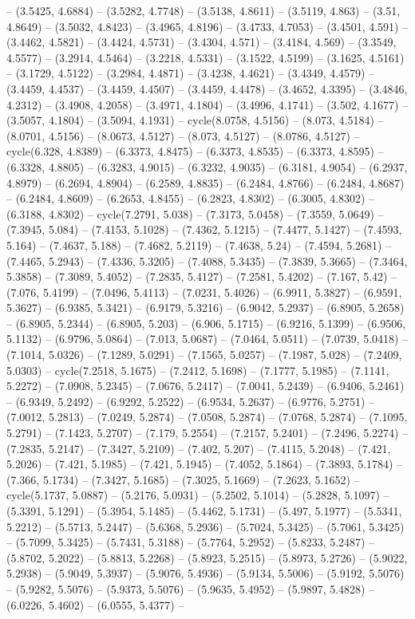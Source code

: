 -- (3.5425, 4.6884) -- (3.5282, 4.7748) -- (3.5138, 4.8611) -- (3.5119, 4.863) -- (3.51, 4.8649) -- (3.5032, 4.8423) -- (3.4965, 4.8196) -- (3.4733, 4.7053) -- (3.4501, 4.591) -- (3.4462, 4.5821) -- (3.4424, 4.5731) -- (3.4304, 4.571) -- (3.4184, 4.569) -- (3.3549, 4.5577) -- (3.2914, 4.5464) -- (3.2218, 4.5331) -- (3.1522, 4.5199) -- (3.1625, 4.5161) -- (3.1729, 4.5122) -- (3.2984, 4.4871) -- (3.4238, 4.4621) -- (3.4349, 4.4579) -- (3.4459, 4.4537) -- (3.4459, 4.4507) -- (3.4459, 4.4478) -- (3.4652, 4.3395) -- (3.4846, 4.2312) -- (3.4908, 4.2058) -- (3.4971, 4.1804) -- (3.4996, 4.1741) -- (3.502, 4.1677) -- (3.5057, 4.1804) -- (3.5094, 4.1931) -- cycle(8.0758, 4.5156) -- (8.073, 4.5184) -- (8.0701, 4.5156) -- (8.0673, 4.5127) -- (8.073, 4.5127) -- (8.0786, 4.5127) -- cycle(6.328, 4.8389) -- (6.3373, 4.8475) -- (6.3373, 4.8535) -- (6.3373, 4.8595) -- (6.3328, 4.8805) -- (6.3283, 4.9015) -- (6.3232, 4.9035) -- (6.3181, 4.9054) -- (6.2937, 4.8979) -- (6.2694, 4.8904) -- (6.2589, 4.8835) -- (6.2484, 4.8766) -- (6.2484, 4.8687) -- (6.2484, 4.8609) -- (6.2653, 4.8455) -- (6.2823, 4.8302) -- (6.3005, 4.8302) -- (6.3188, 4.8302) -- cycle(7.2791, 5.038) -- (7.3173, 5.0458) -- (7.3559, 5.0649) -- (7.3945, 5.084) -- (7.4153, 5.1028) -- (7.4362, 5.1215) -- (7.4477, 5.1427) -- (7.4593, 5.164) -- (7.4637, 5.188) -- (7.4682, 5.2119) -- (7.4638, 5.24) -- (7.4594, 5.2681) -- (7.4465, 5.2943) -- (7.4336, 5.3205) -- (7.4088, 5.3435) -- (7.3839, 5.3665) -- (7.3464, 5.3858) -- (7.3089, 5.4052) -- (7.2835, 5.4127) -- (7.2581, 5.4202) -- (7.167, 5.42) -- (7.076, 5.4199) -- (7.0496, 5.4113) -- (7.0231, 5.4026) -- (6.9911, 5.3827) -- (6.9591, 5.3627) -- (6.9385, 5.3421) -- (6.9179, 5.3216) -- (6.9042, 5.2937) -- (6.8905, 5.2658) -- (6.8905, 5.2344) -- (6.8905, 5.203) -- (6.906, 5.1715) -- (6.9216, 5.1399) -- (6.9506, 5.1132) -- (6.9796, 5.0864) -- (7.013, 5.0687) -- (7.0464, 5.0511) -- (7.0739, 5.0418) -- (7.1014, 5.0326) -- (7.1289, 5.0291) -- (7.1565, 5.0257) -- (7.1987, 5.028) -- (7.2409, 5.0303) -- cycle(7.2518, 5.1675) -- (7.2412, 5.1698) -- (7.1777, 5.1985) -- (7.1141, 5.2272) -- (7.0908, 5.2345) -- (7.0676, 5.2417) -- (7.0041, 5.2439) -- (6.9406, 5.2461) -- (6.9349, 5.2492) -- (6.9292, 5.2522) -- (6.9534, 5.2637) -- (6.9776, 5.2751) -- (7.0012, 5.2813) -- (7.0249, 5.2874) -- (7.0508, 5.2874) -- (7.0768, 5.2874) -- (7.1095, 5.2791) -- (7.1423, 5.2707) -- (7.179, 5.2554) -- (7.2157, 5.2401) -- (7.2496, 5.2274) -- (7.2835, 5.2147) -- (7.3427, 5.2109) -- (7.402, 5.207) -- (7.4115, 5.2048) -- (7.421, 5.2026) -- (7.421, 5.1985) -- (7.421, 5.1945) -- (7.4052, 5.1864) -- (7.3893, 5.1784) -- (7.366, 5.1734) -- (7.3427, 5.1685) -- (7.3025, 5.1669) -- (7.2623, 5.1652) -- cycle(5.1737, 5.0887) -- (5.2176, 5.0931) -- (5.2502, 5.1014) -- (5.2828, 5.1097) -- (5.3391, 5.1291) -- (5.3954, 5.1485) -- (5.4462, 5.1731) -- (5.497, 5.1977) -- (5.5341, 5.2212) -- (5.5713, 5.2447) -- (5.6368, 5.2936) -- (5.7024, 5.3425) -- (5.7061, 5.3425) -- (5.7099, 5.3425) -- (5.7431, 5.3188) -- (5.7764, 5.2952) -- (5.8233, 5.2487) -- (5.8702, 5.2022) -- (5.8813, 5.2268) -- (5.8923, 5.2515) -- (5.8973, 5.2726) -- (5.9022, 5.2938) -- (5.9049, 5.3937) -- (5.9076, 5.4936) -- (5.9134, 5.5006) -- (5.9192, 5.5076) -- (5.9282, 5.5076) -- (5.9373, 5.5076) -- (5.9635, 5.4952) -- (5.9897, 5.4828) -- (6.0226, 5.4602) -- (6.0555, 5.4377) -- 